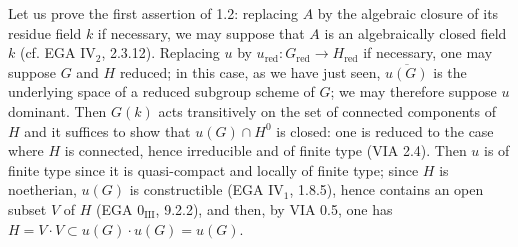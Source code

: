 Let us prove the first assertion of 1.2: replacing $A$ by the algebraic closure of its residue field $k$ if necessary, we may suppose that $A$ is an algebraically closed field $k$ (cf. EGA IV$_2$, 2.3.12). Replacing $u$ by $u_{\mathrm{red}}:G_{\mathrm{red}}\to H_{\mathrm{red}}$ if necessary, one may suppose $G$ and $H$ reduced; in this case, as we have just seen, $\overline{u(G)}$ is the underlying space of a reduced subgroup scheme of $G$; we may therefore suppose $u$ dominant. Then $G(k)$ acts transitively on the set of connected components of $H$ and it suffices to show that $u(G)\cap H^0$ is closed: one is reduced to the case where $H$ is connected, hence irreducible and of finite type (VIA 2.4). Then $u$ is of finite type since it is quasi-compact and locally of finite type; since $H$ is noetherian, $u(G)$ is constructible (EGA IV$_1$, 1.8.5), hence contains an open subset $V$ of $H$ (EGA 0$_{\mathrm{III}}$, 9.2.2), and then, by VIA 0.5, one has $H=V\cdot V\subset u(G)\cdot u(G)=u(G)$.

